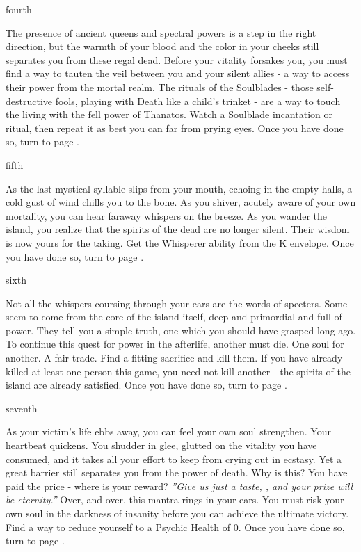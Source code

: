 \documentclass[greennotebook]{Kos}
\begin{document}
\begin{page}{fourth}

The presence of ancient queens and spectral powers is a step in the right direction, but the warmth of your blood and the color in your cheeks still separates you from these regal dead. Before your vitality forsakes you, you must find a way to tauten the veil between you and your silent allies - a way to access their power from the mortal realm. The rituals of the Soulblades - those self-destructive fools, playing with Death like a child’s trinket - are a way to touch the living with the fell power of Thanatos. Watch a Soulblade incantation or ritual, then repeat it as best you can far from prying eyes. Once you have done so, turn to page .

\end{page}

\begin{page}{fifth}

As the last mystical syllable slips from your mouth, echoing in the empty halls, a cold gust of wind chills you to the bone. As you shiver, acutely aware of your own mortality, you can hear faraway whispers on the breeze. As you wander the island, you realize that the spirits of the dead are no longer silent. Their wisdom is now yours for the taking. Get the Whisperer ability from the K envelope. Once you have done so, turn to page .

\end{page}

\begin{page}{sixth}

Not all the whispers coursing through your ears are the words of specters. Some seem to come from the core of the island itself, deep and primordial and full of power. They tell you a simple truth, one which you should have grasped long ago. To continue this quest for power in the afterlife, another must die. One soul for another. A fair trade. Find a fitting sacrifice and kill them. If you have already killed at least one person this game, you need not kill another - the spirits of the island are already satisfied. Once you have done so, turn to page .

\end{page}

\begin{page}{seventh}

As your victim’s life ebbs away, you can feel your own soul strengthen. Your heartbeat quickens. You shudder in glee, glutted on the vitality you have consumed, and it takes all your effort to keep from crying out in ecstasy. Yet a great barrier still separates you from the power of death. Why is this? You have paid the price - where is your reward? \emph{''Give us just a taste, \cAnarchist{}, and your prize will be eternity.''} Over, and over, this mantra rings in your ears. You must risk your own soul in the darkness of insanity before you can achieve the ultimate victory. Find a way to reduce yourself to a Psychic Health of 0. Once you have done so, turn to page .

\end{page}
\end{document}
